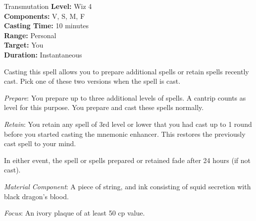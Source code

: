 {Transmutation}
{
	\textbf{Level:}
	Wiz 4\\
	\textbf{Components:}
	V, S, M, F\\
	\textbf{Casting Time:}
	10 minutes\\
	\textbf{Range:}
	Personal\\
	\textbf{Target:}
	You\\
	\textbf{Duration:}
	Instantaneous\\
}
{
	Casting this spell allows you to prepare additional spells or retain spells recently cast. Pick one of these two versions when the spell is cast.

	\textit{Prepare}:
	You prepare up to three additional levels of spells. A cantrip counts as \onehalf level for this purpose. You prepare and cast these spells normally.

	\textit{Retain}:
	You retain any spell of 3rd level or lower that you had cast up to 1 round before you started casting the mnemonic enhancer. This restores the previously cast spell to your mind.

	In either event, the spell or spells prepared or retained fade after 24 hours (if not cast).

	\textit{Material Component}:
	A piece of string, and ink consisting of squid secretion with black dragon's blood.

	\textit{Focus}:
	An ivory plaque of at least 50 cp value.

}
